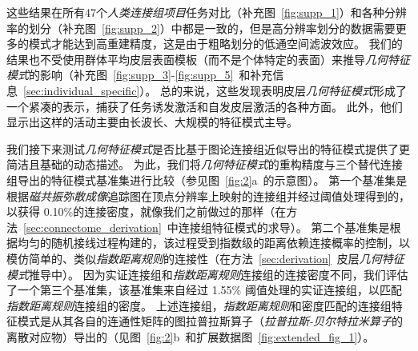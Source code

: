 \documentclass[lang=cn,a4paper,newtx,citestyle=gb7714-2015, bibstyle=gb7714-2015]{elegantpaper}
\begin{document}
这些结果在所有47个\textit{人类连接组项目}任务对比（补充图~\ref{fig:supp_1}）和各种分辨率的划分（补充图~\ref{fig:supp_2}）中都是一致的，但是高分辨率划分的数据需要更多的模式才能达到高重建精度，这是由于粗略划分的低通空间滤波效应。
我们的结果也不受使用群体平均皮层表面模板（而不是个体特定的表面）来推导\textit{几何特征模式}的影响（补充图~\ref{fig:supp_3}-\ref{fig:supp_5}~和补充信息~\ref{sec:individual_specific}）。
总的来说，这些发现表明皮层\textit{几何特征模式}形成了一个紧凑的表示，捕获了任务诱发激活和自发皮层激活的各种方面。
此外，他们显示出这样的活动主要由长波长、大规模的特征模式主导。


我们接下来测试\textit{几何特征模式}是否比基于图论连接组近似导出的特征模式提供了更简洁且基础的动态描述。
为此，我们将\textit{几何特征模式}的重构精度与三个替代连接组导出的特征模式基准集进行比较（参见图~\ref{fig:2}a~的示意图）。
第一个基准集是根据\textit{磁共振弥散成像}追踪图在顶点分辨率上映射的连接组并经过阈值处理得到的，以获得 0.10\%的连接密度，就像我们之前做过的那样（在方法~\ref{sec:connectome_derivation}~中连接组特征模式的求导）。
第二个基准集是根据均匀的随机接线过程构建的，该过程受到指数级的距离依赖连接概率的控制，以模仿简单的、类似\textit{指数距离规则}的连接性（在方法~\ref{sec:derivation}~皮层\textit{几何特征模式}推导中）。
因为实证连接组和\textit{指数距离规则}连接组的连接密度不同，我们评估了一个第三个基准集，该基准集来自经过 1.55\% 阈值处理的实证连接组，以匹配\textit{指数距离规则}连接组的密度。
上述连接组，\textit{指数距离规则}和密度匹配的连接组特征模式是从其各自的连通性矩阵的图拉普拉斯算子（\textit{拉普拉斯-贝尔特拉米算子}的离散对应物）导出的（见图~\ref{fig:2}b~和扩展数据图~\ref{fig:extended_fig_1}）。
\end{document}
